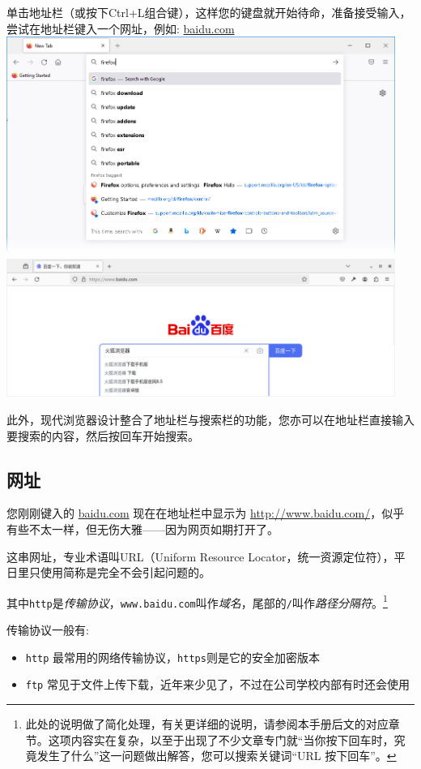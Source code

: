 单击地址栏（或按下Ctrl+L组合键），这样您的键盘就开始待命，准备接受输入，尝试在地址栏键入一个网址，例如: \url{baidu.com} \\
\includegraphics[width=5in]{media/44622-Fx96 Address bar autocomplete.png} \\
\includegraphics[width=5in]{media/firefox-search-baidu.png}

此外，现代浏览器设计整合了地址栏与搜索栏的功能，您亦可以在地址栏直接输入要搜索的内容，然后按回车开始搜索。

\subsection{网址}

您刚刚键入的 \url{baidu.com} 现在在地址栏中显示为 \url{http://www.baidu.com/}，似乎有些不太一样，但无伤大雅------因为网页如期打开了。

这串网址，专业术语叫URL（Uniform Resource Locator，统一资源定位符），平日里只使用简称是完全不会引起问题的。

其中\verb|http|是\textit{传输协议}，\verb|www.baidu.com|叫作\textit{域名}，尾部的\verb|/|叫作\textit{路径分隔符}。\footnote{此处的说明做了简化处理，有关更详细的说明，请参阅本手册后文的对应章节。这项内容实在复杂，以至于出现了不少文章专门就“当你按下回车时，究竟发生了什么”这一问题做出解答，您可以搜索关键词“URL 按下回车”。}

传输协议一般有: 
\begin{itemize}
    \item \verb|http| 最常用的网络传输协议，\verb|https|则是它的安全加密版本
    \item \verb|ftp| 常见于文件上传下载，近年来少见了，不过在公司学校内部有时还会使用
\end{itemize}

